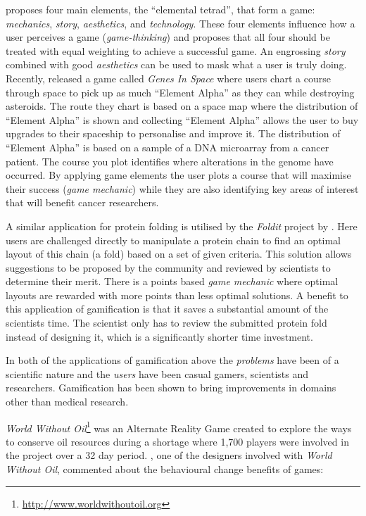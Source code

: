 \citet{artOfGameDesign} proposes four main elements, the ``elemental
tetrad'', that form a game: \emph{mechanics}, \emph{story},
\emph{aesthetics}, and \emph{technology}. These four elements influence
how a user perceives a game (\emph{game-thinking}) and
\citeauthor{artOfGameDesign} proposes that all four should be treated with
equal weighting to achieve a successful game. An engrossing
\emph{story} combined with good \emph{aesthetics} can be used to mask
what a user is truly doing. Recently, \citet{genesInSpace}
released a game called \emph{Genes In Space} where users chart a
course through space to pick up as much ``Element Alpha'' as they can
while destroying asteroids. The route they chart is based on a space
map where the distribution of ``Element Alpha'' is shown and
collecting ``Element Alpha'' allows the user to buy upgrades to their
spaceship to personalise and improve it. The distribution of ``Element
Alpha'' is based on a sample of a DNA microarray from a cancer patient. The 
course you plot identifies where alterations in the genome have
occurred. By applying game elements the user plots a course that will
maximise their success (\emph{game mechanic}) while they are also
identifying key areas of interest that will benefit cancer
researchers. 

A similar application for protein folding is utilised by the \emph{Foldit}
project by \citet{foldit}. Here users are challenged directly to
manipulate a protein chain to find an optimal layout of this chain (a
fold) based on a set of given criteria. This solution allows
suggestions to be proposed by the community and reviewed by scientists
to determine their merit. There is a points based \emph{game mechanic}
where optimal layouts are rewarded with more points than less optimal
solutions. A benefit to this application of gamification is that it
saves a substantial amount of the scientists time. The scientist only
has to review the submitted protein fold instead of designing it,
which is a significantly shorter time investment.

In both of the applications of gamification above the \emph{problems}
have been of a scientific nature and the \emph{users} have been casual
gamers, scientists and researchers. Gamification has been shown to
bring improvements in domains other than medical research.

\emph{World Without
  Oil}\footnote{\url{http://www.worldwithoutoil.org}} was an Alternate
Reality Game created to explore the ways to conserve oil resources
during a shortage where 1,700 players were involved in the project
over a 32 day period. \citet{reality_broken}, one of the designers
involved with \emph{World Without Oil}, commented about the
behavioural change benefits of games:

